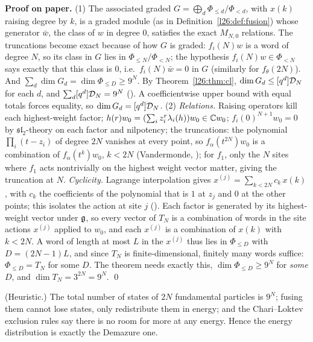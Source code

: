 \textbf{Proof on paper.} (1) The associated graded $G=\bigoplus_d\Phi_{\le d}/\Phi_{<d}$, with $x(k)$ raising degree by $k$, is a
graded module (as in Definition~\ref{l26:def:fusion}) whose generator $\bar w$, the class of $w$ in degree $0$, satisfies the exact
$M_{N,0}$ relations. The truncations become exact because of how $G$ is graded: $f_i(N)w$ is a word of degree $N$, so its class in
$G$ lies in $\Phi_{\le N}/\Phi_{<N}$; the hypothesis $f_i(N)w\in\Phi_{<N}$ says exactly that this class is $0$, i.e.\
$f_i(N)\bar w=0$ in $G$ (similarly for $f_\theta(2N)$). And $\sum_d\dim G_d=\dim\Phi_{\le D}\ge9^N$. By Theorem~\ref{l26:thm:cl}, $\dim G_d\le[q^d]\mathcal D_N$
for each $d$, and $\sum_d[q^d]\mathcal D_N=9^N$ (\lean{demazureHilb_sum}). A coefficientwise upper bound with equal totals
forces equality, so $\dim G_d=[q^d]\mathcal D_N$. (2) \emph{Relations.} Raising operators kill each highest-weight factor;
$h(r)w_0=(\sum_iz_i^r\lambda_i(h))w_0\in{\mathbb{C}} w_0$; $f_i(0)^{N+1}w_0=0$ by $\mathfrak{sl}_2$-theory on each factor and
nilpotency; the truncations: the polynomial $\prod_i(t-z_i)$ of degree $2N$ vanishes at every point, so
$f_\alpha(t^{2N})w_0$ is a combination of $f_\alpha(t^k)w_0$, $k<2N$ (Vandermonde, \lean{vand}); for $f_1$, only the $N$
sites where $f_1$ acts nontrivially on the highest weight vector matter, giving the truncation at $N$. \emph{Cyclicity.}
Lagrange interpolation gives $x^{(j)}=\sum_{k<2N}c_k\,x(k)$, with $c_k$ the coefficients of the polynomial that is $1$ at $z_j$ and $0$
at the other points; this isolates the action at site $j$ (\lean{loc_eq_sum}). Each factor is generated by its highest-weight vector
under $\mathfrak g$, so every vector of $T_N$ is a combination of words in the site actions $x^{(j)}$ applied to $w_0$, and each
$x^{(j)}$ is a combination of $x(k)$ with $k<2N$. A word of length at most $L$ in the $x^{(j)}$ thus lies in $\Phi_{\le D}$ with
$D=(2N-1)L$, and since $T_N$ is finite-dimensional, finitely many words suffice: $\Phi_{\le D}=T_N$ for some $D$. The theorem needs
exactly this, $\dim\Phi_{\le D}\ge9^N$ for \emph{some} $D$, and $\dim T_N=3^{2N}=9^N$. \qed

\begin{physics}
(Heuristic.) The total number of states of $2N$ fundamental particles is $9^N$; fusing them cannot lose states, only redistribute them
in energy; and the Chari--Loktev exclusion rules say there is no room for more at any energy. Hence the energy
distribution is exactly the Demazure one.
\end{physics}

